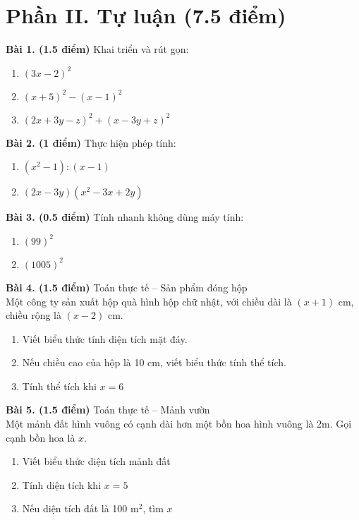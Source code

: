 \documentclass[12pt]{article}
\begin{document}
\section*{Phần II. Tự luận (7.5 điểm)}
\begin{center}
    \begin{minipage}{0.9\textwidth}
\textbf{Bài 1. (1.5 điểm)} Khai triển và rút gọn:
\begin{enumerate}
  \renewcommand{\labelenumi}{(\alph{enumi})}
  \item $(3x - 2)^2$
  \item $(x + 5)^2 - (x - 1)^2$
  \item $(2x + 3y - z)^2 + (x - 3y + z)^2$
\end{enumerate}

\textbf{Bài 2. (1 điểm)} Thực hiện phép tính:
\begin{enumerate}
  \renewcommand{\labelenumi}{(\alph{enumi})}
    \item $(x^2 - 1) : (x - 1)$
    \item $(2x - 3y)(x^2 - 3x + 2y)$
\end{enumerate}

\textbf{Bài 3. (0.5 điểm)} Tính nhanh không dùng máy tính:
\begin{enumerate}
  \renewcommand{\labelenumi}{(\alph{enumi})}
    \item $(99)^2$
    \item $(1005)^2$
\end{enumerate}

\textbf{Bài 4. (1.5 điểm)} Toán thực tế – Sản phẩm đóng hộp \\
Một công ty sản xuất hộp quà hình hộp chữ nhật, với chiều dài là $(x + 1)$ cm, chiều rộng là $(x - 2)$ cm.
\begin{enumerate}
  \renewcommand{\labelenumi}{(\alph{enumi})}
    \item Viết biểu thức tính diện tích mặt đáy.
    \item Nếu chiều cao của hộp là 10 cm, viết biểu thức tính thể tích.
    \item Tính thể tích khi $x = 6$
\end{enumerate}

\textbf{Bài 5. (1.5 điểm)} Toán thực tế – Mảnh vườn \\
Một mảnh đất hình vuông có cạnh dài hơn một bồn hoa hình vuông là 2m. Gọi cạnh bồn hoa là $x$.
\begin{enumerate}
  \renewcommand{\labelenumi}{(\alph{enumi})}
    \item Viết biểu thức diện tích mảnh đất
    \item Tính diện tích khi $x = 5$
    \item Nếu diện tích đất là 100 m$^2$, tìm $x$
\end{enumerate}


\end{minipage}
\end{center}
\end{document}
